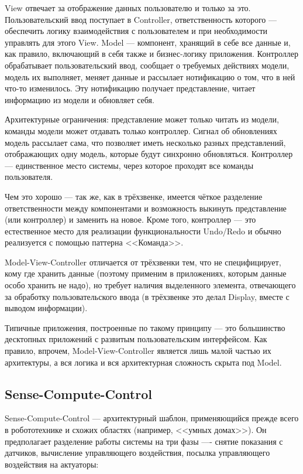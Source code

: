 \documentclass{../../text-style}
\begin{document}
View отвечает за отображение данных пользователю и только за это. Пользовательский ввод поступает в Controller, ответственность которого --- обеспечить логику взаимодействия с пользователем и при необходимости управлять для этого View. Model --- компонент, хранящий в себе все данные и, как правило, включающий в себя также и бизнес-логику приложения. Контроллер обрабатывает пользовательский ввод, сообщает о требуемых действиях модели, модель их выполняет, меняет данные и рассылает нотификацию о том, что в ней что-то изменилось. Эту нотификацию получает представление, читает информацию из модели и обновляет себя.

Архитектурные ограничения: представление может только читать из модели, команды модели может отдавать только контроллер. Сигнал об обновлениях модель рассылает сама, что позволяет иметь несколько разных представлений, отображающих одну модель, которые будут синхронно обновляться. Контроллер --- единственное место системы, через которое проходят все команды пользователя.

Чем это хорошо --- так же, как в трёхзвенке, имеется чёткое разделение ответственности между компонентами и возможность выкинуть представление (или контроллер) и заменить на новое. Кроме того, контроллер --- это естественное место для реализации функциональности Undo/Redo и обычно реализуется с помощью паттерна <<Команда>>. 

Model-View-Controller отличается от трёхзвенки тем, что не специфицирует, кому где хранить данные (поэтому применим в приложениях, которым данные особо хранить не надо), но требует наличия выделенного элемента, отвечающего за обработку пользовательского ввода (в трёхзвенке это делал Display, вместе с выводом информации).

Типичные приложения, построенные по такому принципу --- это большинство десктопных приложений с развитым пользовательским интерфейсом. Как правило, впрочем, Model-View-Controller является лишь малой частью их архитектуры, а вся логика и вся архитектурная сложность скрыта под Model.

\subsection{Sense-Compute-Control}

Sense-Compute-Control --- архитектурный шаблон, применяющийся прежде всего в робототехнике и схожих областях (например, <<умных домах>>). Он предполагает разделение работы системы на три фазы ---- снятие показания с датчиков, вычисление управляющего воздействия, посылка управляющего воздействия на актуаторы:
\end{document}
